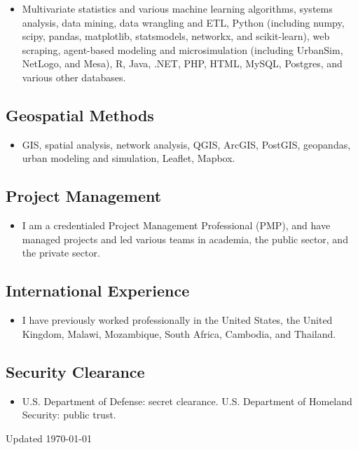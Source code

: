\documentclass{mycv}
\begin{document}
\begin{itemize}
\item Multivariate statistics and various machine learning algorithms, systems analysis, data mining, data wrangling and ETL, Python (including numpy, scipy, pandas, matplotlib, statsmodels, networkx, and scikit-learn), web scraping, agent-based modeling and microsimulation (including UrbanSim, NetLogo, and Mesa), R, Java, .NET, PHP, HTML, MySQL, Postgres, and various other databases.
\end{itemize}

\subsection*{Geospatial Methods}

\begin{itemize}
\item GIS, spatial analysis, network analysis, QGIS, ArcGIS, PostGIS, geopandas, urban modeling and simulation, Leaflet, Mapbox.
\end{itemize}

\subsection*{Project Management}

\begin{itemize}
\item I am a credentialed Project Management Professional (PMP), and have managed projects and led various teams in academia, the public sector, and the private sector.
\end{itemize}

\subsection*{International Experience}

\begin{itemize}
\item I have previously worked professionally in the United States, the United Kingdom, Malawi, Mozambique, South Africa, Cambodia, and Thailand.
\end{itemize}

\subsection*{Security Clearance}

\begin{itemize}
\item U.S. Department of Defense: secret clearance. U.S. Department of Homeland Security: public trust.
\end{itemize}


\begin{center}
\vspace{6em}
Updated \monthyeardate\today
\end{center} 
\end{document}
